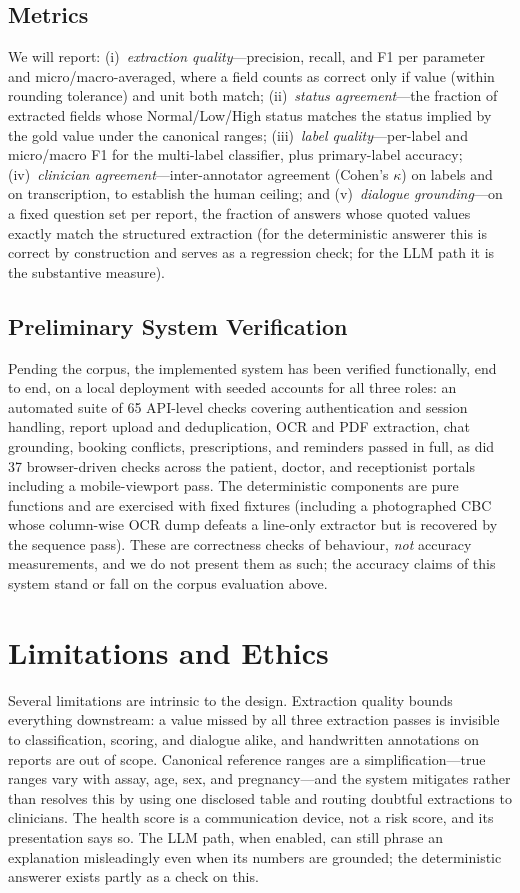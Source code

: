 \documentclass[conference]{IEEEtran}
\begin{document}
\subsection{Metrics}
We will report: (i)~\emph{extraction quality}---precision, recall, and
F1 per parameter and micro/macro-averaged, where a field counts as
correct only if value (within rounding tolerance) and unit both match;
(ii)~\emph{status agreement}---the fraction of extracted fields whose
Normal/Low/High status matches the status implied by the gold value
under the canonical ranges; (iii)~\emph{label quality}---per-label and
micro/macro F1 for the multi-label classifier, plus primary-label
accuracy; (iv)~\emph{clinician agreement}---inter-annotator agreement
(Cohen's $\kappa$) on labels and on transcription, to establish the
human ceiling; and (v)~\emph{dialogue grounding}---on a fixed question
set per report, the fraction of answers whose quoted values exactly
match the structured extraction (for the deterministic answerer this is
correct by construction and serves as a regression check; for the LLM
path it is the substantive measure).

\subsection{Preliminary System Verification}
Pending the corpus, the implemented system has been verified
functionally, end to end, on a local deployment with seeded accounts
for all three roles: an automated suite of 65 API-level checks covering
authentication and session handling, report upload and deduplication,
OCR and PDF extraction, chat grounding, booking conflicts, prescriptions,
and reminders passed in full, as did 37 browser-driven checks across the
patient, doctor, and receptionist portals including a mobile-viewport
pass. The deterministic components are pure functions and are exercised
with fixed fixtures (including a photographed CBC whose column-wise OCR
dump defeats a line-only extractor but is recovered by the sequence
pass). These are correctness checks of behaviour, \emph{not} accuracy
measurements, and we do not present them as such; the accuracy claims
of this system stand or fall on the corpus evaluation above.

\section{Limitations and Ethics}
Several limitations are intrinsic to the design. Extraction quality
bounds everything downstream: a value missed by all three extraction
passes is invisible to classification, scoring, and dialogue alike, and
handwritten annotations on reports are out of scope. Canonical reference
ranges are a simplification---true ranges vary with assay, age, sex,
and pregnancy---and the system mitigates rather than resolves this by
using one disclosed table and routing doubtful extractions to
clinicians. The health score is a communication device, not a risk
score, and its presentation says so. The LLM path, when enabled, can
still phrase an explanation misleadingly even when its numbers are
grounded; the deterministic answerer exists partly as a check on this.
\end{document}
